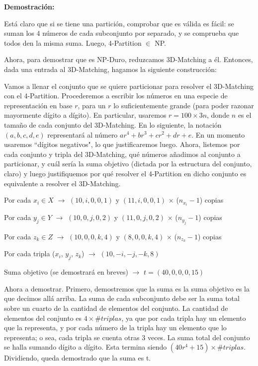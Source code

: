 \documentclass{article}
\begin{document}
\smallskip

\textbf{Demostración:}

\bigskip

Está claro que si se tiene una partición, comprobar que es válida es fácil: se suman los 4 números de cada subconjunto por separado, y se comprueba que todos den la misma suma. Luego, 4-Partition $\in$ NP.

\bigskip

Ahora, para demostrar que es NP-Duro, reduzcamos 3D-Matching a él. Entonces, dada una entrada al 3D-Matching, hagamos la siguiente construcción:

\bigskip

Vamos a llenar el conjunto que se quiere particionar para resolver el 3D-Matching con el 4-Partition. Procederemos a escribir los números en una especie de representación en base $r$, para un $r$ lo suficientemente grande (para poder razonar mayormente dígito a dígito). En particular, usaremos $r = 100 \times 3n$, donde $n$ es el tamaño de cada conjunto del 3D-Matching. En lo siguiente, la notación $(a,b,c,d,e)$ representará al número $ar^4+br^3+cr^2+dr+e$. En un momento usaremos ``dígitos negativos", lo que justificaremos luego. Ahora, listemos por cada conjunto y tripla del 3D-Matching, qué números añadimos al conjunto a particionar, y cuál sería la suma objetivo (dictada por la estructura del conjunto, claro) y luego justifiquemos por qué resolver el 4-Partition en dicho conjunto es equivalente a resolver el 3D-Matching. 

\bigskip
Por cada $x_i \in X$ $\rightarrow$ $(10, i, 0, 0, 1)$ y $(11, i, 0, 0, 1)$ $\times$ ($n_{x_i} - 1$) copias

Por cada $y_j \in Y$ $\rightarrow$ $(10, 0, j, 0, 2)$ y $(11, 0, j, 0, 2)$ $\times$ ($n_{y_j} - 1$) copias

Por cada $z_k \in Z$ $\rightarrow$ $(10, 0, 0, k, 4)$ y $(8, 0, 0, k, 4	)$ $\times$ ($n_{z_k} - 1$) copias

Por cada tripla ($x_i$, $y_j$, $z_k$) $\rightarrow$ $(10, -i, -j, -k, 8)$ 

Suma objetivo (se demostrará en breves) $\rightarrow$ $t = (40, 0, 0, 0, 15)$

\bigskip

Ahora a demostrar. Primero, demostremos que la suma es la suma objetivo es la que decimos allá arriba. La suma de cada subconjunto debe ser la suma total sobre un cuarto de la cantidad de elementos del conjunto. La cantidad de elementos del conjunto es $4 \times \#triplas$, ya que por cada tripla hay un elemento que la representa, y por cada número de la tripla hay un elemento que lo representa; o sea, cada tripla se cuenta otras 3 veces. La suma total del conjunto se halla sumando dígito a dígito. Esta termina siendo $(40r^4+15)\times \#triplas$. Dividiendo, queda demostrado que la suma es t.
\end{document}
